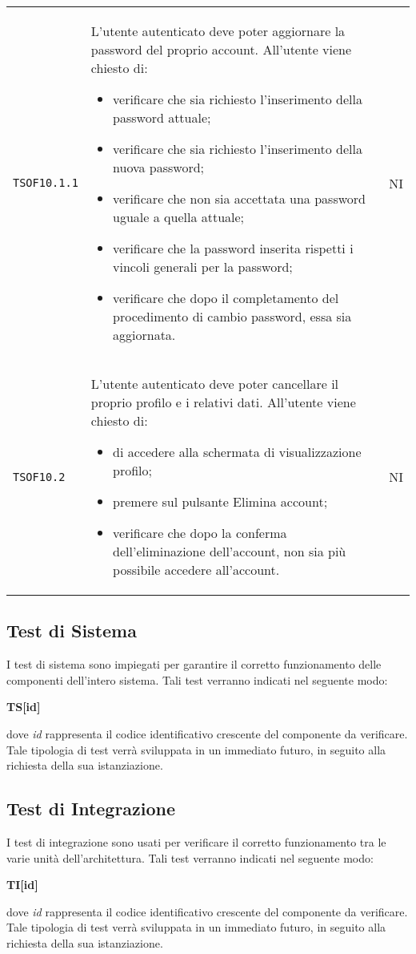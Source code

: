 \begin{longtable}{ >{\centering}p{} >{\centering}p{}
			>{\centering}p{}}
		\texttt{TSOF10.1.1}	&	L'utente autenticato deve poter aggiornare la password del proprio account. All'utente viene chiesto di:
		 \begin{itemize}
		 	\item verificare che sia richiesto l'inserimento della password attuale;
		 	\item verificare che sia richiesto l'inserimento della nuova password;
		 	\item verificare che non sia accettata una password uguale a quella attuale;
		 	\item verificare che la password inserita rispetti i vincoli generali per la password;
		 	\item verificare che dopo il completamento del procedimento di cambio password, essa sia aggiornata.
		 \end{itemize}	&	NI	\tabularnewline
		\texttt{TSOF10.2}	&	L'utente autenticato deve poter cancellare il proprio profilo e i relativi dati. All'utente viene chiesto di:
		 \begin{itemize}
		 	\item di accedere alla schermata di visualizzazione profilo;
		 	\item premere sul pulsante Elimina account;
		 	\item verificare che dopo la conferma dell'eliminazione dell'account, non sia più possibile accedere all'account.
		 \end{itemize}	&	NI	\tabularnewline
	\end{longtable}

\subsection{Test di Sistema}
I test di sistema sono impiegati per garantire il corretto funzionamento delle 
componenti dell'intero sistema. Tali test verranno indicati nel seguente modo:\\
	\centerline{\textbf{TS[id]}}
dove \textit{id} rappresenta il codice identificativo crescente del componente da
verificare.\\
Tale tipologia di test verrà sviluppata in un immediato futuro, in seguito alla richiesta della sua istanziazione.


\subsection{Test di Integrazione}
I test di integrazione sono usati per verificare il corretto funzionamento tra le
varie unità dell'architettura. Tali test verranno indicati nel seguente modo:\\
	\centerline{\textbf{TI[id]}}
dove \textit{id} rappresenta il codice identificativo crescente del componente da
verificare.\\
Tale tipologia di test verrà sviluppata in un immediato futuro, in seguito alla richiesta della sua istanziazione.

